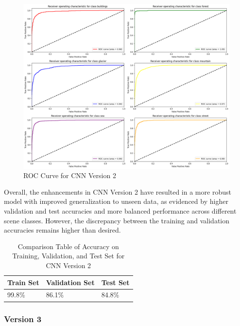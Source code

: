 \documentclass[conference]{IEEEtran}
\begin{document}
\begin{figure}[H]
    \centering
    \includegraphics[width=0.9\linewidth]{images/roc_cnn_2.png}
    \caption{ROC Curve for CNN Version 2}
    \label{fig:rrocCurveCNN2}
\end{figure}

Overall, the enhancements in CNN Version 2 have resulted in a more robust model with improved generalization to unseen data, as evidenced by higher validation and test accuracies and more balanced performance across different scene classes. However, the discrepancy between the training and validation accuracies remains higher than desired.

\begin{table}[H]
    \centering
    \caption{Comparison Table of Accuracy on Training, Validation, and Test Set for CNN Version 2}
    \renewcommand{\arraystretch}{1.5}
    \begin{tabularx}{0.8\linewidth}{|X|X|X|}
    \hline
    \cellcolor[HTML]{EFEFEF}\textbf{Train Set} & \cellcolor[HTML]{EFEFEF}\textbf{Validation Set} & \cellcolor[HTML]{EFEFEF}\textbf{Test Set} \\ \hline
     99.8\%  & 86.1\%  & 84.8\%\\ \hline
    \end{tabularx}
    \label{tab:accMobileNetV2_1}
\end{table}

\vspace{2mm}

\subsubsection{Version 3}
\hfill\\
\end{document}

